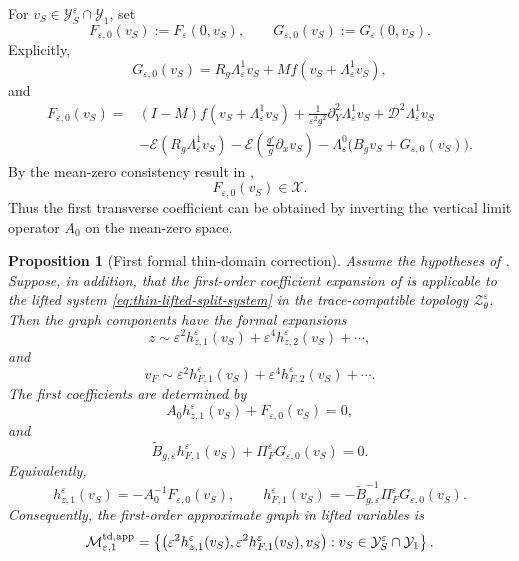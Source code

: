 \documentclass[11pt]{article}
\newtheorem{proposition}[theorem]{Proposition}
\theoremstyle{definition}
\theoremstyle{remark}
\numberwithin{equation}{section}
\begin{document}
For \(v_S\in\mathcal Y_S^\varepsilon\cap\mathcal Y_1\), set
\[
F_{\varepsilon,0}(v_S)
:=
F_\varepsilon(0,v_S),
\qquad
G_{\varepsilon,0}(v_S)
:=
G_\varepsilon(0,v_S).
\]
Explicitly,
\[
G_{\varepsilon,0}(v_S)
=
R_g\Lambda_\varepsilon^1v_S
+
Mf(v_S+\Lambda_\varepsilon^1v_S),
\]
and
\begin{align}
\label{eq:thin-F-eps-zero}
F_{\varepsilon,0}(v_S)
={}&
(I-M)f(v_S+\Lambda_\varepsilon^1v_S)
+
\frac1{\varepsilon^2g^2}\partial_Y^2\Lambda_\varepsilon^1v_S
+
\mathcal D^2\Lambda_\varepsilon^1v_S
\nonumber\\
&-
\mathcal E(R_g\Lambda_\varepsilon^1v_S)
-
\mathcal E\!\left(\frac{g'}g\partial_xv_S\right)
-
\Lambda_\varepsilon^0
\bigl(B_gv_S+G_{\varepsilon,0}(v_S)\bigr).
\end{align}
By the mean-zero consistency result in
,
\[
F_{\varepsilon,0}(v_S)\in\mathcal X.
\]
Thus the first transverse coefficient can be obtained by inverting the
vertical limit operator \(A_0\) on the mean-zero space.

\begin{proposition}[First formal thin-domain correction]
\label{prop:first-thin-domain-correction}
Assume the hypotheses of
. Suppose, in addition, that
the first-order coefficient expansion of  is
applicable to the lifted system \eqref{eq:thin-lifted-split-system} in the
trace-compatible topology \(\mathcal Z_\theta^\varepsilon\). Then the graph
components have the formal expansions
\[
z
\sim
\varepsilon^2h_{z,1}^\varepsilon(v_S)
+
\varepsilon^4h_{z,2}^\varepsilon(v_S)
+
\cdots,
\]
and
\[
v_F
\sim
\varepsilon^2h_{F,1}^\varepsilon(v_S)
+
\varepsilon^4h_{F,2}^\varepsilon(v_S)
+
\cdots .
\]
The first coefficients are determined by
\begin{equation}
\label{eq:first-thin-z-correction}
A_0h_{z,1}^\varepsilon(v_S)
+
F_{\varepsilon,0}(v_S)
=
0,
\end{equation}
and
\begin{equation}
\label{eq:first-thin-vF-correction}
\widetilde B_{g,\varepsilon}h_{F,1}^\varepsilon(v_S)
+
\Pi_F^\varepsilon G_{\varepsilon,0}(v_S)
=
0.
\end{equation}
Equivalently,
\[
h_{z,1}^\varepsilon(v_S)
=
-A_0^{-1}F_{\varepsilon,0}(v_S),
\qquad
h_{F,1}^\varepsilon(v_S)
=
-
\widetilde B_{g,\varepsilon}^{-1}
\Pi_F^\varepsilon G_{\varepsilon,0}(v_S).
\]
Consequently, the first-order approximate graph in lifted variables is
\[
\mathcal M_{\varepsilon,1}^{\rm td,app}
=
\left\{
\bigl(
\varepsilon^2h_{z,1}^\varepsilon(v_S),
\varepsilon^2h_{F,1}^\varepsilon(v_S),
v_S
\bigr):
v_S\in \mathcal Y_S^\varepsilon\cap\mathcal Y_1
\right\}.
\]
\end{proposition}
\end{document}
